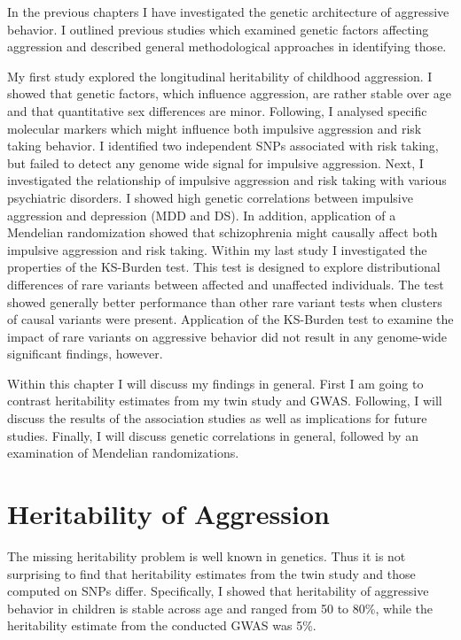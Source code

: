 
In the previous chapters I have investigated the genetic architecture of aggressive behavior.
I outlined previous studies which examined genetic factors affecting aggression and described general methodological approaches in identifying those.

My first study explored the longitudinal heritability of childhood aggression.
I showed that genetic factors, which influence aggression, are rather stable over age and that quantitative sex differences are minor.
Following, I analysed specific molecular markers which might influence both impulsive aggression and risk taking behavior.
I identified two independent SNPs associated with risk taking, but failed to detect any genome wide signal for impulsive aggression.
Next, I investigated the relationship of impulsive aggression and risk taking with various psychiatric disorders.
I showed  high genetic correlations between impulsive aggression and depression (MDD and DS).
In addition, application of a Mendelian randomization showed that schizophrenia might causally affect both impulsive aggression and risk taking.
Within my last study I investigated the properties of the KS-Burden test.
This test is designed to explore distributional differences of rare variants between affected and unaffected individuals.
The test showed generally better performance than other rare variant tests when clusters of causal variants were present.
Application of the KS-Burden test to examine the impact of rare variants on aggressive behavior did not result in any genome-wide significant findings, however.

Within this chapter I will discuss my findings in general.
First I am going to contrast heritability estimates from  my twin study and GWAS\@.
Following, I will discuss the results of the association studies as well as implications for future studies.
Finally, I will discuss genetic correlations in general, followed by an examination of Mendelian randomizations.

\section{Heritability of Aggression}
\label{sec:heritability_of_aggression}

The missing heritability problem is well known in genetics.
Thus it is not surprising to find that heritability estimates from the twin study and those computed on SNPs differ.
Specifically, I showed that heritability of aggressive behavior in children is stable across age and ranged from 50 to 80\%, while the heritability estimate from the conducted GWAS was 5\%. 

